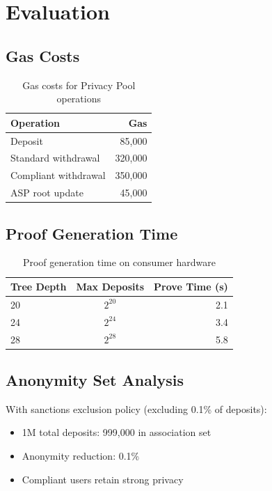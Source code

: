 \documentclass[11pt,a4paper]{article}
\theoremstyle{definition}
\begin{document}
\section{Evaluation}

\subsection{Gas Costs}

\begin{table}[h]
\centering
\begin{tabular}{lr}
\toprule
\textbf{Operation} & \textbf{Gas} \\
\midrule
Deposit & 85,000 \\
Standard withdrawal & 320,000 \\
Compliant withdrawal & 350,000 \\
ASP root update & 45,000 \\
\bottomrule
\end{tabular}
\caption{Gas costs for Privacy Pool operations}
\end{table}

\subsection{Proof Generation Time}

\begin{table}[h]
\centering
\begin{tabular}{lcr}
\toprule
\textbf{Tree Depth} & \textbf{Max Deposits} & \textbf{Prove Time (s)} \\
\midrule
20 & $2^{20}$ & 2.1 \\
24 & $2^{24}$ & 3.4 \\
28 & $2^{28}$ & 5.8 \\
\bottomrule
\end{tabular}
\caption{Proof generation time on consumer hardware}
\end{table}

\subsection{Anonymity Set Analysis}

With sanctions exclusion policy (excluding 0.1\% of deposits):
\begin{itemize}
    \item 1M total deposits: 999,000 in association set
    \item Anonymity reduction: 0.1\%
    \item Compliant users retain strong privacy
\end{itemize}
\end{document}
